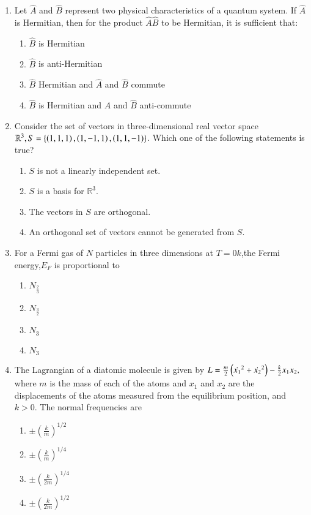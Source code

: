 \documentclass[journal]{IEEEtran}
\begin{document}
\begin{enumerate}[start=37]
\item  Let $ \hat{A} $ and $ \hat{B} $ represent two physical characteristics of a quantum system. If $ \hat{A} $ is Hermitian, then for the product $\hat{A}\hat{B} $ to be Hermitian, it is sufficient that:
\begin{enumerate}
\item   $\hat{B}$ is Hermitian
\item   $\hat{B}$ is anti-Hermitian
\item   $\hat{B}$  Hermitian and  $\hat{A}$ and  $\hat{B}$  commute
\item   $\hat{B}$  is Hermitian and  $\hat{A}$  and $\hat{B}$ anti-commute
\end{enumerate}
\item Consider the set of vectors in three-dimensional real vector space\\
$\mathbb{R}^{3},S=\left\{\left(1,1,1\right),\left(1,-1,1\right),\left(1,1,-1\right)\right\}$. Which one of the following statements is true?
\begin{enumerate}
    \item $S$ is not a linearly independent set.
    \item $S$ is a basis for $\mathbb{R}^{3}$.
    \item The vectors in $S$ are orthogonal.
    \item An orthogonal set of vectors cannot be generated from $S$.
\end{enumerate}
\item For a Fermi gas of $N$ particles in three dimensions at $T=0k$,the Fermi energy,$E_{F}$ is proportional to
\begin{enumerate}
    \item $N_{\frac{2}{3}}$
    \item $N_{\frac{3}{2}}$
    \item $N_{3}$
    \item $N_{3}$
\end{enumerate}
\item  The Lagrangian of a diatomic molecule is given by $L = \frac{m}{2}\left(\dot{x_1}^{2} + \dot{x_2}^{2}\right) - \frac{k}{2}x_{1}x_{2},$
where $m$ is the mass of each of the atoms and $x_{1}$ and $x_{2}$ are the displacements of the atoms measured from the equilibrium position, and $k > 0$. The normal frequencies are 
\begin{multicols}{4}
\begin{enumerate}
\item $\pm \left(\frac{k}{m}\right)^{1/2}$ 
\item $\pm \left(\frac{k}{m}\right)^{1/4}$ 
\item $\pm \left(\frac{k}{2m}\right)^{1/4}$ 
\item $\pm \left(\frac{k}{2m}\right)^{1/2}$
\end{enumerate}
\end{multicols}


\end{enumerate}
\end{document}
